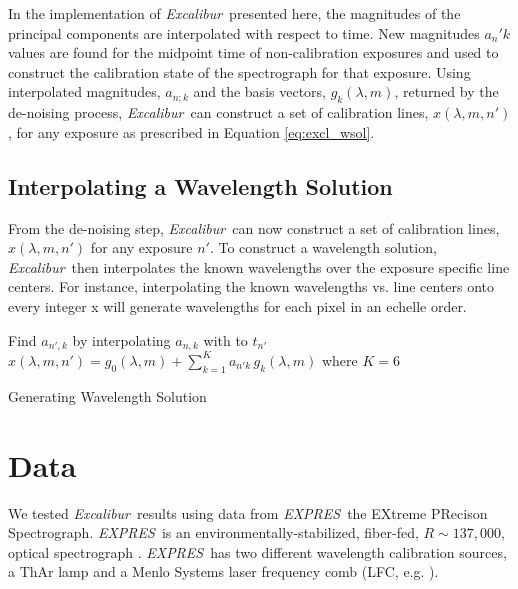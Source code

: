 \documentclass[12pt, onecolumn]{aastex63}
\newcommand{\project}[1]{\textsl{#1}}
\newcommand{\name}{\project{Excalibur}}
\newcommand{\acronym}[1]{{\small{#1}}}
\newcommand{\expres}{\project{\acronym{EXPRES}}}
\begin{document}
In the implementation of \name\ presented here, the magnitudes of the principal components are interpolated with respect to time.  New magnitudes $a_n'k$ values are found for the midpoint time of non-calibration exposures and used to construct the calibration state of the spectrograph for that exposure.  Using interpolated magnitudes, $a_{n;k}$ and the basis vectors, $g_k(\lambda,m)$, returned by the de-noising process, \name\ can construct a set of calibration lines, $x(\lambda,m,n') $, for any exposure as prescribed in Equation \ref{eq:excl_wsol}.


\subsection{Interpolating a Wavelength Solution} \label{sec:interp_wsol}
From the de-noising step, \name\ can now construct a set of calibration lines, $x(\lambda,m,n')$ for any exposure $n'$.  To construct a wavelength solution, \name\ then interpolates the known wavelengths over the exposure specific line centers.  For instance, interpolating the known wavelengths vs. line centers onto every integer x will generate wavelengths for each pixel in an echelle order.

\begin{algorithm}
\SetAlgoLined
{}

Find $a_{n',k}$ by interpolating $a_{n,k}$ with to $t_{n'}$\;
$x(\lambda,m,n') = g_0(\lambda,m) + \sum_{k=1}^K a_{n'k}\,g_k(\lambda,m)$ where $K=6$\;
\caption{Generating Wavelength Solution}
\end{algorithm}


\section{Data} \label{sec:data}
We tested \name\ results using data from \expres\, the EXtreme PRecison Spectrograph.  \expres\ is an environmentally-stabilized, fiber-fed, $R\sim137,000$, optical spectrograph \citep{jurgenson2016, blackman2020}.  \expres\ has two different wavelength calibration sources, a ThAr lamp and a Menlo Systems laser frequency comb (LFC, e.g. \cite{wilken2012, molaro2013, probst2014}).
\end{document}
